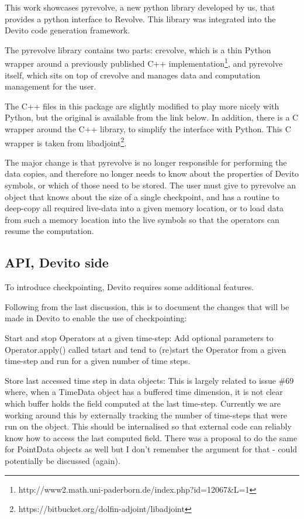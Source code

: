 \documentclass[sigconf]{acmart}
\begin{document}
This work showcases pyrevolve, a new python library developed by us, that provides a python
interface to Revolve. This library was integrated into the Devito code generation framework.

The pyrevolve library contains two parts: crevolve, which is a thin Python wrapper around a
previously published C++
implementation\footnote{http://www2.math.uni-paderborn.de/index.php?id=12067\&L=1}, and pyrevolve
itself, which sits on top of crevolve and manages data and computation management for the user.

The C++ files in this package are slightly modified to play more nicely with Python, but the
original is available from the link below. In addition, there is a C wrapper around the C++ library,
to simplify the interface with Python. This C wrapper is taken from
libadjoint\footnote{https://bitbucket.org/dolfin-adjoint/libadjoint}.

The major change is that pyrevolve is no longer responsible for performing the data copies, and
therefore no longer needs to know about the properties of Devito symbols, or which of those need to
be stored. The user must give to pyrevolve an object that knows about the size of a single
checkpoint, and has a routine to deep-copy all required live-data into a given memory location, or
to load data from such a memory location into the live symbols so that the operators can resume the
computation.

\subsection{API, Devito side}

To introduce checkpointing, Devito requires some additional features.

Following from the last discussion, this is to document the changes that will be made in Devito to
enable the use of checkpointing:

Start and stop Operators at a given time-step: Add optional parameters to Operator.apply() called
tstart and tend to (re)start the Operator from a given time-step and run for a given number of time
steps.

Store last accessed time step in data objects: This is largely related to issue \#69 where, when a
TimeData object has a buffered time dimension, it is not clear which buffer holds the field computed
at the last time-step. Currently we are working around this by externally tracking the number of
time-steps that were run on the object. This should be internalised so that external code can
reliably know how to access the last computed field. There was a proposal to do the same for
PointData objects as well but I don't remember the argument for that - could potentially be
discussed (again).
\end{document}
